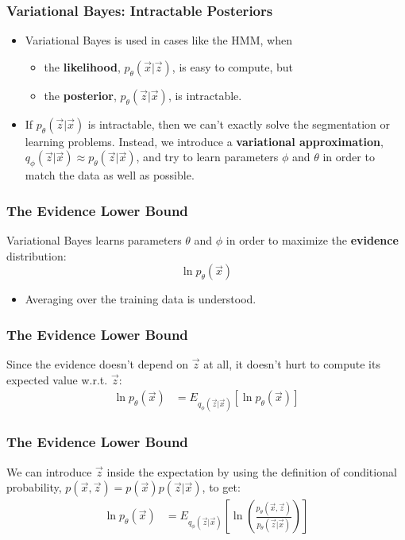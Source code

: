 \documentclass{beamer}
\begin{document}
\begin{frame}
  \frametitle{Variational Bayes: Intractable Posteriors}

  \begin{itemize}
  \item Variational Bayes is used in cases like the HMM, when
    \begin{itemize}
      \item the {\bf likelihood}, $p_\theta(\vec{x}|\vec{z})$, is easy to compute,
        but
      \item the {\bf posterior}, $p_\theta(\vec{z}|\vec{x})$, is intractable.
    \end{itemize}
  \item If $p_\theta(\vec{z}|\vec{x})$ is intractable, then we can't
    exactly solve the segmentation or learning problems.  Instead, we
    introduce a {\bf variational approximation},
    $q_\phi(\vec{z}|\vec{x})\approx p_\theta(\vec{z}|\vec{x})$, and
    try to learn parameters $\phi$ and $\theta$
    in order to match the data as well as possible.
  \end{itemize}
\end{frame}

\begin{frame}
  \frametitle{The Evidence Lower Bound}

  Variational Bayes learns parameters $\theta$ and $\phi$ in order to
  maximize the {\bf evidence} distribution:
  \begin{displaymath}
    \ln p_\theta(\vec{x})
  \end{displaymath}
  \begin{itemize}
  \item Averaging over the training data is understood.
  \end{itemize}
\end{frame}

\begin{frame}
  \frametitle{The Evidence Lower Bound}

  Since the evidence doesn't depend on $\vec{z}$ at all, it doesn't
  hurt to compute its expected value w.r.t. $\vec{z}$:
  \begin{align*}
    \ln p_\theta(\vec{x})
    &=E_{q_\phi(\vec{z}|\vec{x})}\left[\ln p_\theta(\vec{x})\right]
  \end{align*}
\end{frame}

\begin{frame}
  \frametitle{The Evidence Lower Bound}

  We can introduce $\vec{z}$ inside the expectation by using the
  definition of conditional probability,
  $p(\vec{x},\vec{z})=p(\vec{x})p(\vec{z}|\vec{x})$, to get:
  \begin{align*}
    \ln p_\theta(\vec{x})
    &=E_{q_\phi(\vec{z}|\vec{x})}
    \left[
      \ln\left(
      \frac{p_\theta(\vec{x},\vec{z})}{p_\theta(\vec{z}|\vec{x})}
      \right)
      \right]
  \end{align*}
\end{frame}
\end{document}
